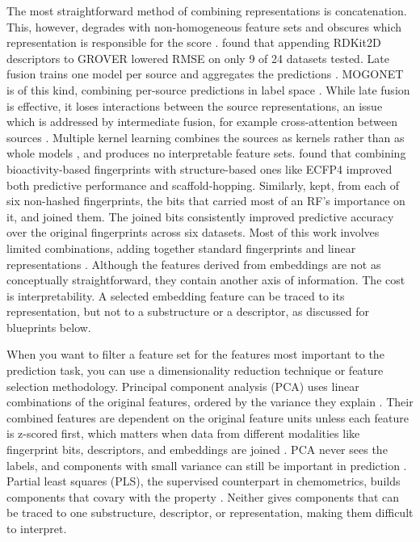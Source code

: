 The most straightforward method of combining representations is concatenation. This, however, degrades with non-homogeneous feature sets and obscures which representation is responsible for the score \citep{Stahlschmidt2022}. \citet{Deng2023} found that appending RDKit2D descriptors to GROVER lowered RMSE on only 9 of 24 datasets tested. Late fusion trains one model per source and aggregates the predictions \citep{Steyaert2023}. MOGONET is of this kind, combining per-source predictions in label space \citep{Wang2021}. While late fusion is effective, it loses interactions between the source representations, an issue which is addressed by intermediate fusion, for example cross-attention between sources \citep{Beaude2025}. Multiple kernel learning combines the sources as kernels rather than as whole models \citep{Gonen2011, Cichonska2018}, and produces no interpretable feature sets. \citet{Laufktter2019} found that combining bioactivity-based fingerprints with structure-based ones like ECFP4 improved both predictive performance and scaffold-hopping. Similarly, \citet{Turkina2025} kept, from each of six non-hashed fingerprints, the bits that carried most of an RF's importance on it, and joined them. The joined bits consistently improved predictive accuracy over the original fingerprints across six datasets. Most of this work involves limited combinations, adding together standard fingerprints and linear representations \citep{Xie2020, Laufktter2019}. Although the features derived from embeddings are not as conceptually straightforward, they contain another axis of information. The cost is interpretability. A selected embedding feature can be traced to its representation, but not to a substructure or a descriptor, as discussed for blueprints below. 

When you want to filter a feature set for the features most important to the prediction task, you can use a dimensionality reduction technique or feature selection methodology. Principal component analysis (PCA) uses linear combinations of the original features, ordered by the variance they explain \citep{Jolliffe2016}. Their combined features are dependent on the original feature units unless each feature is z-scored first, which matters when data from different modalities like fingerprint bits, descriptors, and embeddings are joined \citep{Jolliffe2016}. PCA never sees the labels, and components with small variance can still be important in prediction \citep{Jolliffe1982}. Partial least squares (PLS), the supervised counterpart in chemometrics, builds components that covary with the property \citep{Wold2001}. Neither gives components that can be traced to one substructure, descriptor, or representation, making them difficult to interpret.

